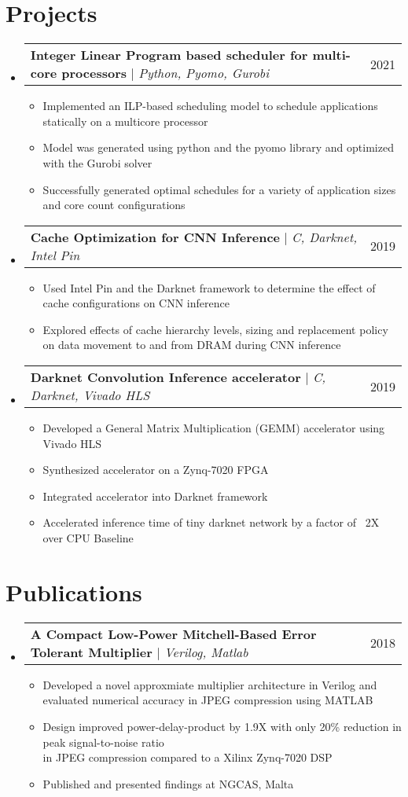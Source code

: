 \documentclass[letterpaper,11pt]{article}
\makeatletter
\newcommand{\resumeItem}[1]{
  \item\small{
    {#1 \vspace{-2pt}}
  }
}
\newcommand{\resumeProjectHeading}[2]{
    \item
    \begin{tabular*}{0.97\textwidth}{l@{\extracolsep{\fill}}r}
      \small#1 & #2 \\
    \end{tabular*}\vspace{-7pt}
}
\newcommand{\resumeSubHeadingListStart}{\begin{itemize}[leftmargin=0.15in, label={}]}
\newcommand{\resumeSubHeadingListEnd}{\end{itemize}}
\newcommand{\resumeItemListStart}{\begin{itemize}}
\newcommand{\resumeItemListEnd}{\end{itemize}\vspace{-5pt}}
\makeatother
\begin{document}
\section{Projects}
    \resumeSubHeadingListStart
      \resumeProjectHeading
          {\textbf{Integer Linear Program based scheduler for multi-core processors} $|$ \emph{Python, Pyomo, Gurobi}}{2021}
          \resumeItemListStart
            \resumeItem{Implemented an ILP-based scheduling model to schedule applications statically on a multicore processor }
            \resumeItem{Model was generated using python and the pyomo library and optimized with the Gurobi solver }
            \resumeItem{Successfully generated optimal schedules for a variety of application sizes and core count configurations}
          \resumeItemListEnd
        \resumeProjectHeading
          {\textbf{Cache Optimization for CNN Inference} $|$ \emph{C, Darknet, Intel Pin}}{2019}
          \resumeItemListStart
            \resumeItem{Used Intel Pin and the Darknet framework to determine the effect of cache configurations on CNN inference}
            \resumeItem{Explored effects of cache hierarchy levels, sizing and replacement policy on data movement to and from DRAM during CNN inference}
          \resumeItemListEnd
        \resumeProjectHeading
          {\textbf{Darknet Convolution Inference accelerator} $|$ \emph{C, Darknet, Vivado HLS}}{2019}
          \resumeItemListStart
            \resumeItem{Developed a General Matrix Multiplication (GEMM) accelerator using Vivado HLS}
            \resumeItem{Synthesized accelerator on a Zynq-7020 FPGA}
            \resumeItem{Integrated accelerator into Darknet framework}
            \resumeItem{Accelerated inference time of tiny darknet network by a factor of ~2X over CPU Baseline}
          \resumeItemListEnd
    \resumeSubHeadingListEnd

%
\section{Publications}
    \resumeSubHeadingListStart
      \resumeProjectHeading
          {\textbf{A Compact Low-Power Mitchell-Based Error Tolerant Multiplier} $|$ \emph{Verilog, Matlab} }{2018}
          \resumeItemListStart
            \resumeItem{Developed a novel approxmiate multiplier architecture in Verilog and evaluated numerical accuracy in JPEG compression using MATLAB }
            \resumeItem{Design improved power-delay-product by 1.9X with only 20\% reduction in peak signal-to-noise ratio \\ in JPEG compression compared to a Xilinx Zynq-7020 DSP}
            \resumeItem{Published and presented findings at NGCAS, Malta}
          \resumeItemListEnd
    \resumeSubHeadingListEnd
\end{document}

